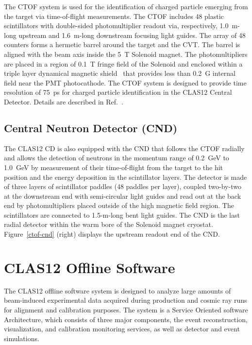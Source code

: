 \documentclass[final,3p,twocolumn]{elsarticle}
\begin{document}
The CTOF system is used for the identification of charged particle emerging from the target via time-of-flight
measurements. The CTOF includes 48 plastic scintillators with double-sided photomultiplier readout via, respectively,
1.0~m-long upstream and 1.6~m-long downstream focusing light guides. The array of 48 counters forms a hermetic barrel
around the target and the CVT. The barrel is aligned with the beam axis inside the 5~T Solenoid magnet. The 
photomultipliers are placed in a region of 0.1~T fringe field of the Solenoid and enclosed within a triple layer dynamical
magnetic shield~\cite{Baturin:2012zz} that provides less than 0.2~G internal field near the PMT photocathode. The CTOF
system is designed to provide time resolution of 75~ps for charged particle identification in the CLAS12 Central Detector.
Details are described in Ref.~\cite{CTOF}.  

\subsection{Central Neutron Detector (CND)}

The CLAS12 CD is also equipped with the CND that follows the CTOF radially and allows the detection of neutrons in
the momentum range of 0.2~GeV to 1.0~GeV by measurement of their time-of-flight from the target to the hit
position and the energy deposition in the scintillator layers. The detector is made of three layers of scintillator paddles
(48 paddles per layer), coupled two-by-two at the downstream end with semi-circular light guides and read out at the
back end by photomultipliers placed outside of the high magnetic field region. The scintillators are connected to 1.5-m-long
bent light guides. The CND is the last radial detector within the warm bore of the Solenoid magnet cryostat. 
Figure~\ref{ctof-cnd} (right) displays the upstream readout end of the CND. 

\section{CLAS12 Offline Software}  

The CLAS12 offline software system is designed to analyze large amounts of beam-induced experimental data acquired
during production and cosmic ray runs for alignment and calibration purposes. The system is a Service Oriented software
Architecture, which consists of three major components, the event reconstruction, visualization, and calibration
monitoring services, as well as detector and event simulations.  
\end{document}
